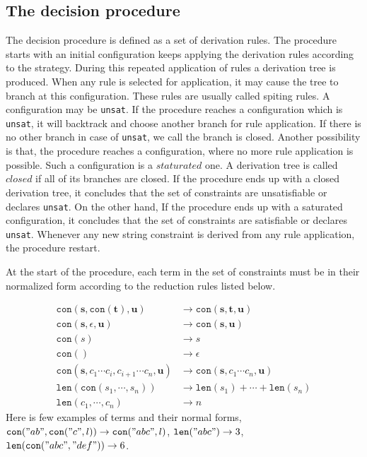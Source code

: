   \subsection{The decision procedure}  
  The decision procedure is defined as a set of derivation rules. The procedure starts with an initial configuration keeps applying the derivation rules according to the strategy. During this repeated application of rules a derivation tree is produced.  When any rule is selected for application, it may cause the tree to branch at this configuration. These  rules are usually called spiting rules. A configuration may be \texttt{unsat}. If the procedure reaches a configuration which is \texttt{unsat}, it will backtrack and choose another branch for rule application. If there is no other branch in case of \texttt{unsat}, we call the branch is closed. Another possibility is that, the procedure reaches a configuration, where no more rule application is possible. Such a configuration is a $staturated$ one. A derivation tree is called $closed$ if all of its branches are closed. If the procedure ends up with a closed derivation tree, it concludes that the set of constraints are unsatisfiable or declares \texttt{unsat}. On the other hand,  If the procedure ends up with a saturated configuration, it concludes that the set of constraints are satisfiable or declares \texttt{unsat}. Whenever any new string constraint is derived from any rule application, the procedure restart. 
      
  At the start of the procedure, each term in the set of constraints must be in their normalized form according to the reduction rules listed below.   

					  \begin{align*}
					  \texttt{con}(\mathbf{s},  \texttt{con}(\mathbf{t}), \mathbf{u}) &\rightarrow   \texttt{con}(\mathbf{s},\mathbf{t}, \mathbf{u})\\
					  \texttt{con}(\mathbf{s}, \epsilon, \mathbf{u}) &\rightarrow \texttt{con}(\mathbf{s}, \mathbf{u})\\
					  \texttt{con}(s) &\rightarrow s\\
					  \texttt{con}() &\rightarrow \epsilon\\
					  \texttt{con}(\mathbf{s}, c_1 \cdots c_i, c_{i+1} \cdots c_n, \mathbf{u}) &\rightarrow \texttt{con}(\mathbf{s}, c_1 \cdots c_n, \mathbf{u})\\
					  \texttt{len}( \texttt{con}(s_1,\cdots,s_n)) &\rightarrow \texttt{len}(s_1) + \cdots + \texttt{len}(s_n)\\
					  \texttt{len}(c_1,\cdots,c_n) &\rightarrow n
					  \end{align*}					 
  Here is few examples of terms and their normal forms, 
  $\texttt{con}("ab", \texttt{con}("c", l)) \rightarrow \texttt{con}("abc",l) $, $\texttt{len}("abc") \rightarrow 3$,\\ $\texttt{len}(\texttt{con}("abc", "def"))\rightarrow 6$. 
  
